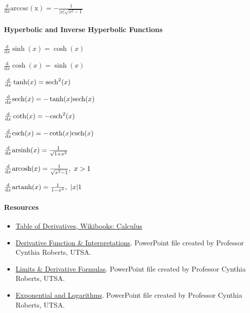 $
\frac{\mathrm{d}}{\mathrm{d}x}\operatorname{arccsc(x)}=-\frac{1}{|x|\sqrt{x^2-1}}
$
\paragraph{Hyperbolic and Inverse Hyperbolic Functions}
$
\frac{\mathrm{d}}{\mathrm{d}x}\sinh(x)=\cosh(x)
$



$
\frac{\mathrm{d}}{\mathrm{d}x}\cosh(x)=\sinh(x)
$



$
\frac{\mathrm{d}}{\mathrm{d}x}\tanh(x)={\rm sech}^2(x)
$



$
\frac{\mathrm{d}}{\mathrm{d}x}{\rm sech}(x)=-\tanh(x){\rm sech}(x)
$



$
\frac{\mathrm{d}}{\mathrm{d}x}\coth(x)=-{\rm csch}^2(x)
$



$
\frac{\mathrm{d}}{\mathrm{d}x}{\rm csch}(x)=-\coth(x){\rm csch}(x)
$



$
\frac{\mathrm{d}}{\mathrm{d}x}{\rm arsinh}(x)=\frac{1}{\sqrt{1+x^2}}
$



$
\frac{\mathrm{d}}{\mathrm{d}x}{\rm arcosh}(x)=\frac{1}{\sqrt{x^2-1}},\ x>1
$



$
\frac{\mathrm{d}}{\mathrm{d}x}{\rm artanh}(x)=\frac{1}{1-x^2},\ |x|1
$
\paragraph{Resources}



\begin{itemize}
    \item \href{https://en.wikibooks.org/wiki/Calculus/Tables_of_Derivatives}{Table of Derivatives, Wikibooks: Calculus}
    \item \href{https://mathresearch.utsa.edu/wikiFiles/MAT1193/Derivative\%20Formulas/Presentation3_DerivativeFunction\%20\&\%20Interpretations.pptx}{Derivative Function \& Interpretations}. PowerPoint file created by Professor Cynthia Roberts, UTSA.
    \item \href{https://mathresearch.utsa.edu/wikiFiles/MAT1193/Derivative\%20Formulas/Presentation3b,4,5_Limits\%20\&\%20Derivative\%20Formulas.pptx}{Limits \& Derivative Formulas}. PowerPoint file created by Professor Cynthia Roberts, UTSA.
    \item \href{https://mathresearch.utsa.edu/wikiFiles/MAT1193/Derivative\%20Formulas/Presentation5b_Exponential\%20and\%20Logs.pptx}{Exponential and Logarithms}. PowerPoint file created by Professor Cynthia Roberts, UTSA.
\end{itemize}

